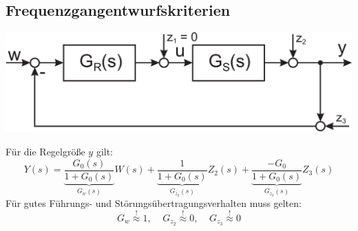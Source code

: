 \documentclass[a4paper,twocolumn,10pt]{article}
\newcommand{\sollseinapprox}{\stackrel{!}{\approx}}
\begin{document}
\subsection{Frequenzgangentwurfskriterien}
\begin{center}
\includegraphics[width=0.8\columnwidth]{Grafiken/Regelkreisentwurf_Grundstruktur}
\end{center}
Für die Regelgröße $y$ gilt:
\begin{equation*}
Y(s)=\underbrace{\frac{G_0(s)}{1+G_0(s)}}_{G_w(s)}W(s)+\underbrace{\frac{1}{1+G_0(s)}}_{G_{z_2}(s)}Z_2(s)+\underbrace{\frac{-G_0}{1+G_0(s)}}_{G_{z_3}(s)}Z_3(s)
\end{equation*}
Für gutes Führungs- und Störungsübertragungsverhalten muss gelten:
\begin{equation*}
G_w\sollseinapprox 1,\;\;\;\;G_{z_2}\sollseinapprox 0,\;\;\;\;G_{z_3}\sollseinapprox 0
\end{equation*}
\end{document}
